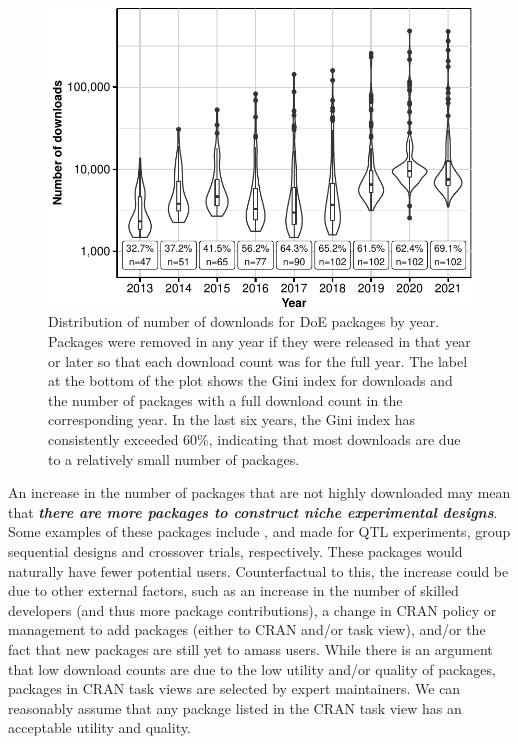 \begin{figure}[htbp]

{\centering \includegraphics{figures/download-share-1} 

}

\caption{Distribution of number of downloads for DoE packages by year. Packages were removed in any year if they were released in that year or later so that each download count was for the full year. The label at the bottom of the plot shows the Gini index for downloads and the number of packages with a full download count in the corresponding year. In the last six years, the Gini index has consistently exceeded 60\%, indicating that most downloads are due to a relatively small number of packages. }\label{fig:download-share}
\end{figure}

An increase in the number of packages that are not highly downloaded may mean that \textbf{\emph{there are more packages to construct niche experimental designs}}. Some examples of these packages include ,  and  made for QTL experiments, group sequential designs and crossover trials, respectively. These packages would naturally have fewer potential users. Counterfactual to this, the increase could be due to other external factors, such as an increase in the number of skilled developers (and thus more package contributions), a change in CRAN policy or management to add packages (either to CRAN and/or task view), and/or the fact that new packages are still yet to amass users. While there is an argument that low download counts are due to the low utility and/or quality of packages, packages in CRAN task views are selected by expert maintainers. We can reasonably assume that any package listed in the CRAN task view has an acceptable utility and quality.

